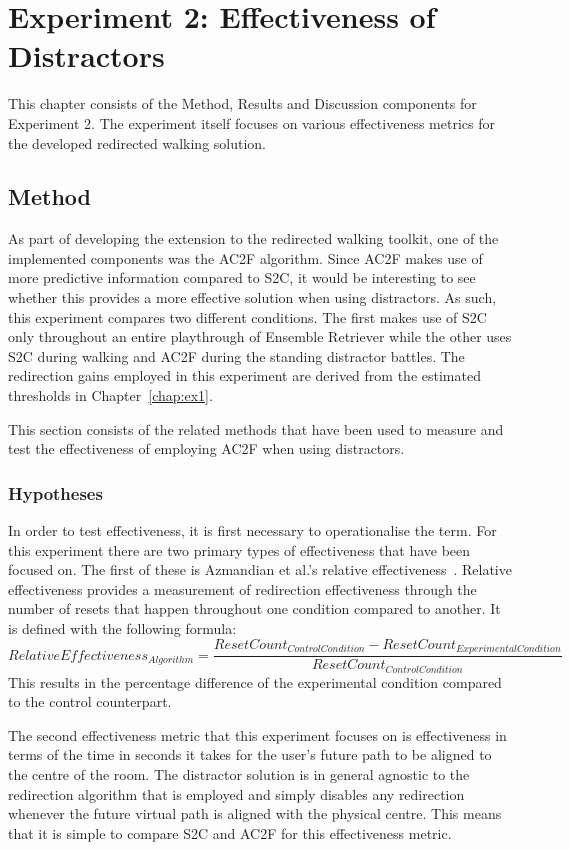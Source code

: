 \chapter{Experiment 2: Effectiveness of Distractors}
This chapter consists of the Method, Results and Discussion components for Experiment 2. The experiment itself focuses on various effectiveness metrics for the developed redirected walking solution. 

\section{Method}
As part of developing the extension to the redirected walking toolkit, one of the implemented components was the AC2F algorithm. Since AC2F makes use of more predictive information compared to S2C, it would be interesting to see whether this provides a more effective solution when using distractors. As such, this experiment compares two different conditions. The first makes use of S2C only throughout an entire playthrough of Ensemble Retriever while the other uses S2C during walking and AC2F during the standing distractor battles. The redirection gains employed in this experiment are derived from the estimated thresholds in Chapter~\ref{chap:ex1}. 

This section consists of the related methods that have been used to measure and test the effectiveness of employing AC2F when using distractors. 

\subsection{Hypotheses}
In order to test effectiveness, it is first necessary to operationalise the term. For this experiment there are two primary types of effectiveness that have been focused on. The first of these is Azmandian et al.'s relative effectiveness~\cite{azmandian2015physical}. Relative effectiveness provides a measurement of redirection effectiveness through the number of resets that happen throughout one condition compared to another. It is defined with the following formula:
$$
RelativeEffectiveness_{Algorithm} = \frac{ResetCount_{ControlCondition} - ResetCount_{ExperimentalCondition}}{ResetCount_{ControlCondition}}
$$
This results in the percentage difference of the experimental condition compared to the control counterpart. 

The second effectiveness metric that this experiment focuses on is effectiveness in terms of the time in seconds it takes for the user's future path to be aligned to the centre of the room. The distractor solution is in general agnostic to the redirection algorithm that is employed and simply disables any redirection whenever the future virtual path is aligned with the physical centre. This means that it is simple to compare S2C and AC2F for this effectiveness metric.

